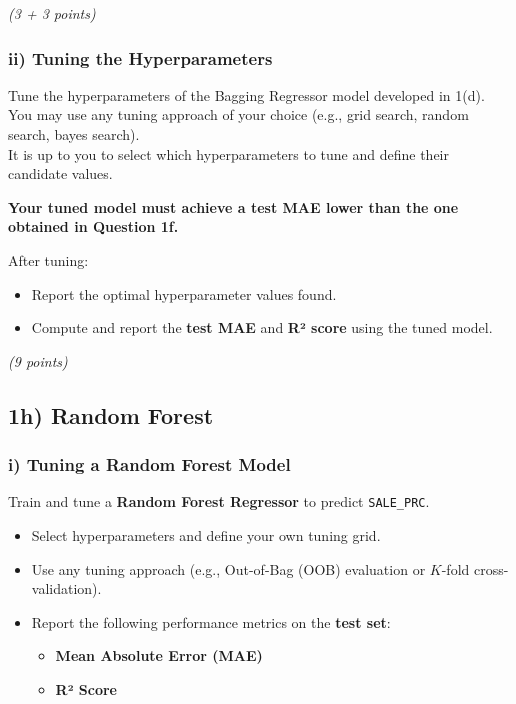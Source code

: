 \documentclass[
  letterpaper,
  DIV=11,
  numbers=noendperiod]{scrreprt}
\providecommand{\tightlist}{%
  \setlength{\itemsep}{0pt}\setlength{\parskip}{0pt}}\usepackage{longtable,booktabs,array}
\begin{document}
\emph{(3 + 3 points)}

\subsubsection{ii) Tuning the
Hyperparameters}\label{ii-tuning-the-hyperparameters}

Tune the hyperparameters of the Bagging Regressor model developed in
1(d).\\
You may use any tuning approach of your choice (e.g., grid search,
random search, bayes search).\\
It is up to you to select which hyperparameters to tune and define their
candidate values.

\textbf{Your tuned model must achieve a test MAE lower than the one
obtained in Question 1f.}

After tuning:

\begin{itemize}
\tightlist
\item
  Report the optimal hyperparameter values found.
\item
  Compute and report the \textbf{test MAE} and \textbf{R² score} using
  the tuned model.
\end{itemize}

\emph{(9 points)}

\subsection{1h) Random Forest}\label{h-random-forest}

\subsubsection{i) Tuning a Random Forest
Model}\label{i-tuning-a-random-forest-model}

Train and tune a \textbf{Random Forest Regressor} to predict
\texttt{SALE\_PRC}.

\begin{itemize}
\tightlist
\item
  Select hyperparameters and define your own tuning grid.
\item
  Use any tuning approach (e.g., Out-of-Bag (OOB) evaluation or
  \(K\)-fold cross-validation).
\item
  Report the following performance metrics on the \textbf{test set}:

  \begin{itemize}
  \tightlist
  \item
    \textbf{Mean Absolute Error (MAE)}
  \item
    \textbf{R² Score}
  \end{itemize}
\end{itemize}
\end{document}
